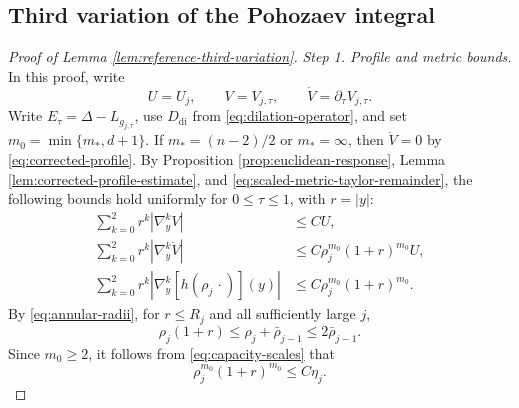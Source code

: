 \documentclass[11pt]{article}
\numberwithin{equation}{section}
\theoremstyle{remark}
\begin{document}
 \subsection*{Third variation of the Pohozaev integral}\label{app:third-variation}

\begin{proof}[Proof of Lemma  \ref{lem:reference-third-variation}]
\emph{Step 1. Profile and metric bounds.}
In this proof, write
\[
 U=U_j,\qquad
 V=V_{j,\tau},\qquad
 \dot V=\partial_\tau V_{j,\tau}.
\]
Write \(E_\tau=\Delta-L_{g_{j,\tau}}\), use
\(D_{\mathrm{di}}\) from \eqref{eq:dilation-operator}, and set
\(m_0=\min\{m_*,d+1\}\).
If \(m_*=(n-2)/2\) or \(m_*=\infty\), then
\(\dot V=0\) by \eqref{eq:corrected-profile}.  {By
Proposition  \ref{prop:euclidean-response},
Lemma  \ref{lem:corrected-profile-estimate}, and
\eqref{eq:scaled-metric-taylor-remainder}, the following bounds hold uniformly for
\(0\le\tau\le1\), with \(r=|y|\):}
{
\begin{equation}\label{eq:third-order-profile-bounds}
 \begin{aligned}
 \sum_{k=0}^2r^k|\nabla_y^kV|
 &\le CU,\\
 \sum_{k=0}^2r^k|\nabla_y^k\dot V|
 &\le C\rho_j^{m_0}(1+r)^{m_0}U,\\
  \sum_{k=0}^2r^k|\nabla_y^k[h(\rho_j\,\cdot)](y)|
 &\le C\rho_j^{m_0}(1+r)^{m_0}.
 \end{aligned}
\end{equation}
}
{By \eqref{eq:annular-radii}, for \(r\le R_j\) and all
sufficiently large \(j\),}
\[
 \rho_j(1+r)\le \rho_j+\bar\rho_{j-1}
 \le2\bar\rho_{j-1}.
\]
{Since \(m_0\ge2\), it follows from
\eqref{eq:capacity-scales} that}
\[
 \rho_j^{m_0}(1+r)^{m_0}\le C\eta_j.
\]


\end{proof}
\end{document}
